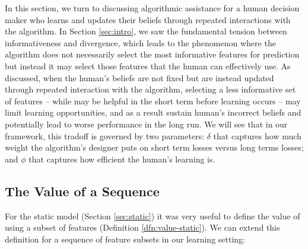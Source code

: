 In this section, we turn to discussing algorithmic assistance for a human decision maker who learns and updates their beliefs through repeated interactions with the algorithm.
In Section \ref{sec:intro}, we saw the fundamental tension between informativeness and divergence, which leads to the phenomenon where the algorithm does not necessarily select 
the most informative features for prediction but instead it may select those features that the human can effectively use. 
As discussed, when the human's beliefs are not fixed but are instead updated through repeated interaction with the algorithm, selecting a less informative set of features -- while may be helpful in the short term before learning occurs -- may limit learning opportunities, and as a result sustain human's incorrect beliefs and potentially lead to worse performance in the long run. We will see that in our framework, this tradoff is governed by two parameters: $\delta$ that captures how much weight the algorithm's designer puts on short term losses versus long terms losses; and $\phi$ that captures how efficient the human's learning is.




\subsection{The Value of a Sequence }
For the static model (Section \ref{sec:static}) it was very useful to define the value of using a subset of features (Definition \ref{dfn:value-static}). We can extend this definition for a sequence of feature subsets in our learning setting:


